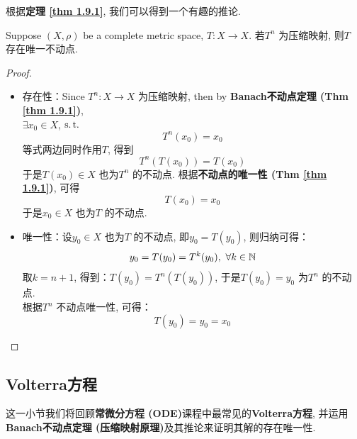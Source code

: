 	\vspace{4em}
	
	根据\textbf{定理 \ref{thm 1.9.1}}, 我们可以得到一个有趣的推论.
	\begin{corollary}\label{cor 1.9.2}
		Suppose $(X , \rho)$ be a complete metric space, $T : X \longrightarrow X$. 若$T^n$ 为压缩映射, 则$T$ 存在唯一不动点.
		
		\vspace{2em}
		
		\begin{proof}
			\begin{itemize}
				\item 存在性：Since $T^n : X \longrightarrow X$ 为压缩映射, then by \textbf{Banach不动点定理 (Thm \ref{thm 1.9.1})}, \\
				$\exists x_0 \in X$, $\operatorname{s.t.}$
				\[ T^{n}(x_0) = x_0 \]
				等式两边同时作用$T$, 得到
				\[ T^{n}(T(x_0)) = T(x_0) \]
				于是$T(x_0) \in X$ 也为$T^n$ 的不动点. 根据\textbf{不动点的唯一性 (Thm \ref{thm 1.9.1})}, 可得
				\[ T(x_0) = x_0 \]
				于是$x_0 \in X$ 也为$T$ 的不动点.
				
				\vspace{2em}
				
				\item 唯一性：设$y_0 \in X$ 也为$T$ 的不动点, 即$y_0 = T(y_0)$, 则归纳可得：
				\[ y_0 = T(y_0) = T^{k}(y_0) , \,\, \forall k \in \mathbb{N} \]
				取$k = n + 1$, 得到：$T(y_0) = T^{n}(T(y_0))$, 于是$T(y_0) = y_0$ 为$T^n$ 的不动点. \\
				根据$T^n$ 不动点唯一性, 可得：
				\[ T(y_0) = y_0 = x_0 \]
			\end{itemize}
		\end{proof}
	\end{corollary}

\newpage

\subsection{Volterra方程}
	这一小节我们将回顾\textbf{常微分方程 (ODE)}课程中最常见的\textbf{Volterra方程}, 并运用\textbf{Banach不动点定理 (压缩映射原理)}及其推论来证明其解的存在唯一性.
	
